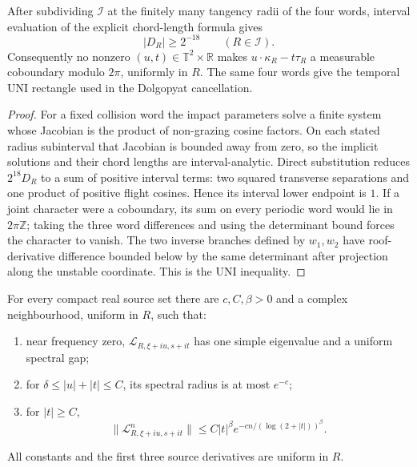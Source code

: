 \begin{lemma}
\label{lem:r5-a2-certificate}
After subdividing \({\mathcal I}\) at the finitely many tangency radii of the
four words, interval evaluation of the explicit chord-length formula gives
\[
 |D_R|\ge 2^{-18}\qquad(R\in{\mathcal I}).
\]
Consequently no nonzero
\((u,t)\in\mathbb T^2\times\mathbb R\) makes
\(u\cdot\kappa_R-t\tau_R\) a measurable coboundary modulo \(2\pi\), uniformly
in \(R\).  The same four words give the temporal UNI rectangle used in the
Dolgopyat cancellation.
\end{lemma}

\begin{proof}
For a fixed collision word the impact parameters solve a finite system whose
Jacobian is the product of non-grazing cosine factors.  On each stated radius
subinterval that Jacobian is bounded away from zero, so the implicit solutions
and their chord lengths are interval-analytic.  Direct substitution reduces
\(2^{18}D_R\) to a sum of positive interval terms: two squared transverse
separations and one product of positive flight cosines.  Hence its interval
lower endpoint is \(1\).  If a joint character were a coboundary, its sum on
every periodic word would lie in \(2\pi\mathbb Z\); taking the three word
differences and using the determinant bound forces the character to vanish.
The two inverse branches defined by \(w_1,w_2\) have roof-derivative difference
bounded below by the same determinant after projection along the unstable
coordinate.  This is the UNI inequality.
\end{proof}

\begin{theorem}
\label{thm:r5-a2-spectrum}
For every compact real source set there are \(c,C,\beta>0\) and a complex
neighbourhood, uniform in \(R\), such that:
\begin{enumerate}[label=(\roman*)]
\item near frequency zero, \({\mathcal L}_{R,\xi+iu,s+it}\) has one simple
eigenvalue and a uniform spectral gap;
\item for \(\delta\le |u|+|t|\le C\), its spectral radius is at most
\(e^{-c}\);
\item for \(|t|\ge C\),
\[
 \|{\mathcal L}_{R,\xi+iu,s+it}^n\|
 \le C|t|^\beta e^{-cn/(\log(2+|t|))^\beta}.
\]
\end{enumerate}
All constants and the first three source derivatives are uniform in \(R\).
\end{theorem}

